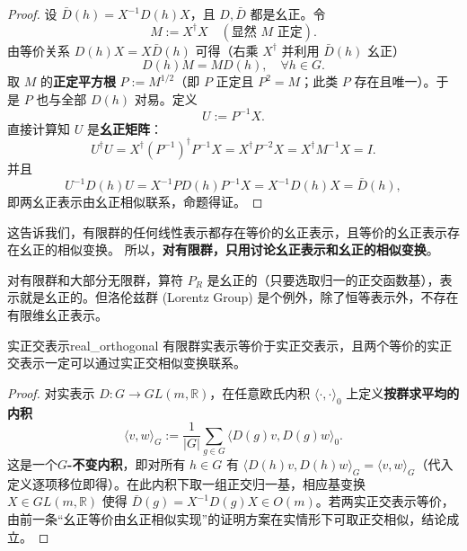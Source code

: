 \begin{proof}
    设 $\bar D(h)=X^{-1} D(h) X$，且 $D,\bar D$ 都是幺正。令
    \begin{equation*}
        M := X^\dagger X \quad(\text{显然 } M \text{ 正定}).
    \end{equation*}
    由等价关系 $D(h) X = X \bar D(h)$ 可得（右乘 $X^\dagger$ 并利用 $\bar D(h)$ 幺正）
    \begin{equation*}
        D(h) M = M D(h), \quad \forall h\in G.
    \end{equation*}
    取 $M$ 的\textbf{正定平方根} $P:=M^{1/2}$（即 $P$ 正定且 $P^2=M$；此类 $P$ 存在且唯一）。于是 $P$ 也与全部 $D(h)$ 对易。定义
    \begin{equation*}
        U := P^{-1} X.
    \end{equation*}
    直接计算知 $U$ 是\textbf{幺正矩阵}：
    \begin{equation*}
        U^\dagger U = X^\dagger (P^{-1})^\dagger P^{-1} X = X^\dagger P^{-2} X = X^\dagger M^{-1} X = I.
    \end{equation*}
    并且
    \begin{equation*}
        U^{-1} D(h) U = X^{-1} P D(h) P^{-1} X = X^{-1} D(h) X = \bar D(h),
    \end{equation*}
    即两幺正表示由幺正相似联系，命题得证。
\end{proof}

\begin{note}
    这告诉我们，有限群的任何线性表示都存在等价的幺正表示，且等价的幺正表示存在幺正的相似变换。
    所以，\textbf{对有限群，只用讨论幺正表示和幺正的相似变换}。
    
    对有限群和大部分无限群，算符 $P_R$ 是幺正的（只要选取归一的正交函数基），表示就是幺正的。但洛伦兹群 (Lorentz Group) 是个例外，除了恒等表示外，不存在有限维幺正表示。
\end{note}

\begin{corollary}{实正交表示}{real_orthogonal}
    有限群实表示等价于实正交表示，且两个等价的实正交表示一定可以通过实正交相似变换联系。
\end{corollary}

\begin{proof}
    对实表示 $D: G\to GL(m,\mathbb{R})$，在任意欧氏内积 $\langle\cdot,\cdot\rangle_0$ 上定义\textbf{按群求平均的内积}
    \begin{equation*}
        \langle v,w\rangle_G := \frac{1}{|G|} \sum_{g\in G} \langle D(g)v, D(g)w\rangle_0.
    \end{equation*}
    这是一个\textbf{$G$-不变内积}，即对所有 $h\in G$ 有 $\langle D(h)v, D(h)w\rangle_G=\langle v,w\rangle_G$（代入定义逐项移位即得）。在此内积下取一组正交归一基，相应基变换 $X\in GL(m,\mathbb{R})$ 使得 $\bar D(g)=X^{-1}D(g)X\in O(m)$。若两实正交表示等价，由前一条“幺正等价由幺正相似实现”的证明方案在实情形下可取正交相似，结论成立。
\end{proof}

